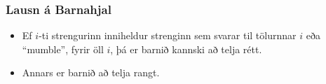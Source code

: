 \documentclass[handout]{beamer}
\newcommand\env[2]
{
	\begin{#1}
	#2
	\end{#1}
}
\newcommand\code[1]{\tiny}
\begin{document}
\env{frame}
{
	\frametitle{Lausn á Barnahjal}
	\env{itemize}
	{
		\item<1-> Ef $i$-ti strengurinn inniheldur strenginn sem svarar til tölurnnar $i$ eða ``mumble'', fyrir öll $i$,
			þá er barnið kannski að telja rétt.
		\item<2-> Annars er barnið að telja rangt.
	}
}

\env{frame}
{
	\code{babybites.py}
}

\end{document}
